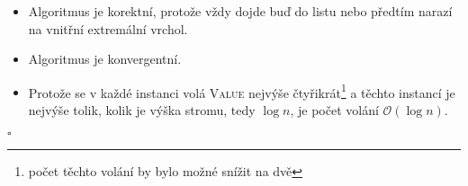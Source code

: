 \documentclass[12pt]{article}
\renewcommand{\O}{\mathcal{O}}
\begin{document}
\begin{itemize}
\item Algoritmus je korektní, protože vždy dojde buď do listu nebo předtím narazí na vnitřní
extremální vrchol.
\item Algoritmus je konvergentní.
\item Protože se v každé instanci volá \textsc{Value} nejvýše čtyřikrát\footnote{počet těchto volání
by bylo možné snížit na dvě} a těchto instancí je nejvýše tolik, kolik je výška stromu, tedy $\log
n$, je počet volání $\O(\log n)$.
\end{itemize}

\hfill$\square$
\end{document}
